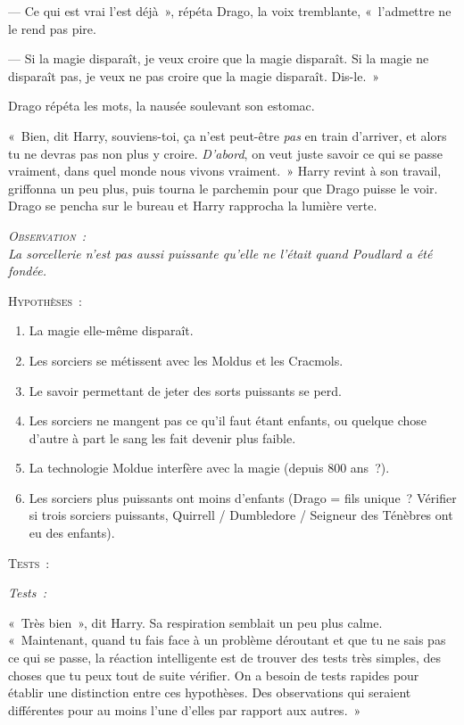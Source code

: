 --- Ce qui est vrai l'est déjà~», répéta Drago, la voix tremblante, «~l'admettre ne le rend pas pire.

--- Si la magie disparaît, je veux croire que la magie disparaît.
Si la magie ne disparaît pas, je veux ne pas croire que la magie disparaît.
Dis-le.~»

Drago répéta les mots, la nausée soulevant son estomac.

«~Bien, dit Harry, souviens-toi, ça n'est peut-être \emph{pas} en train d'arriver, et alors tu ne devras pas non plus y croire.
\emph{D'abord}, on veut juste savoir ce qui se passe vraiment, dans quel monde nous vivons vraiment.~»
Harry revint à son travail, griffonna un peu plus, puis tourna le parchemin pour que Drago puisse le voir.
Drago se pencha sur le bureau et Harry rapprocha la lumière verte.

\begin{center}\itshape
{\scshape Observation~:}\\
La sorcellerie n'est pas aussi puissante qu'elle ne l'était quand Poudlard a été fondée.

{\scshape Hypothèses~:}
\begin{enumerate}[1.]\firmlist
\item La magie elle-même disparaît.
\item Les sorciers se métissent avec les Moldus et les Cracmols.
\item Le savoir permettant de jeter des sorts puissants se perd.
\item Les sorciers ne mangent pas ce qu'il faut étant enfants, ou quelque chose d'autre à part le sang les fait devenir plus faible.
\item La technologie Moldue interfère avec la magie (depuis 800 ans~?).
\item Les sorciers plus puissants ont moins d'enfants (Drago = fils unique~?
Vérifier si trois sorciers puissants, Quirrell / Dumbledore / Seigneur des Ténèbres ont eu des enfants).
\end{enumerate} {\scshape Tests~:} \end{center}

\emph{{Tests~:}}

«~Très bien~», dit Harry.
Sa respiration semblait un peu plus calme.
«~Maintenant, quand tu fais face à un problème déroutant et que tu ne sais pas ce qui se passe, la réaction intelligente est de trouver des tests très simples, des choses que tu peux tout de suite vérifier.
On a besoin de tests rapides pour établir une distinction entre ces hypothèses.
Des observations qui seraient différentes pour au moins l'une d'elles par rapport aux autres.~»

